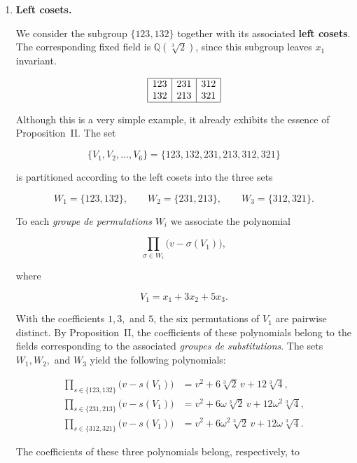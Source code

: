 \documentclass[a4paper,11pt]{article}
\begin{document}
\begin{enumerate}
	
	\item \textbf{Left cosets.}
	
	We consider the subgroup \(\{123,132\}\) together with its associated \textbf{left cosets}. The corresponding fixed field is
	\(\mathbb{Q}(\sqrt[3]{2})\), since this subgroup leaves \(x_1\) invariant.
	
	\begin{equation}
		\label{eq:tabel221}
		\begin{array}{|c|c|c|}
			\hline
			123 & 231 & 312\\
			132 & 213 & 321\\
			\hline
		\end{array}
	\end{equation}
	
	Although this is a very simple example, it already exhibits the essence of Proposition~II. The set
	
	\[
	\{V_1,V_2,\dots,V_6\}
	=
	\{123,132,231,213,312,321\}
	\]
	
	is partitioned according to the left cosets into the three sets
	
	\[
	W_1=\{123,132\},\qquad
	W_2=\{231,213\},\qquad
	W_3=\{312,321\}.
	\]
	
	To each \textit{groupe de permutations} \(W_i\) we associate the polynomial
	
	\[
	\prod_{\sigma\in W_i}\bigl(v-\sigma(V_1)\bigr),
	\]
	
	where
	
	\[
	V_1=x_1+3x_2+5x_3.
	\]
	
	With the coefficients \(1,3,\) and \(5\), the six permutations of \(V_1\) are pairwise distinct. By Proposition~II, the coefficients of these polynomials belong to the fields corresponding to the associated \textit{groupes de substitutions}. The sets \(W_1,W_2,\) and \(W_3\) yield the following polynomials:
	
	\[
	\begin{aligned}
		\prod_{s\in\{123,132\}}\bigl(v-s(V_1)\bigr)
		&=
		v^2+6\sqrt[3]{2}\,v+12\sqrt[3]{4},\\
		\prod_{s\in\{231,213\}}\bigl(v-s(V_1)\bigr)
		&=
		v^2+6\omega\sqrt[3]{2}\,v+12\omega^2\sqrt[3]{4},\\
		\prod_{s\in\{312,321\}}\bigl(v-s(V_1)\bigr)
		&=
		v^2+6\omega^2\sqrt[3]{2}\,v+12\omega\sqrt[3]{4}.
	\end{aligned}
	\]
	
	The coefficients of these three polynomials belong, respectively, to
	

\end{enumerate}
\end{document}
